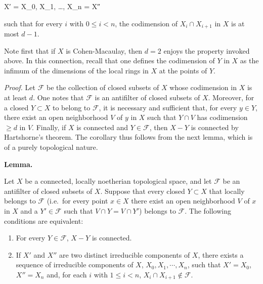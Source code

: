 \documentclass[
]{article}
\newenvironment{Shaded}{}{}
\newcommand{\NormalTok}[1]{#1}
\providecommand{\tightlist}{%
  \setlength{\itemsep}{0pt}\setlength{\parskip}{0pt}}
\begin{document}
\begin{Shaded}
\begin{Highlighting}[]
\NormalTok{X′ = X\_0, X\_1, …, X\_n = X″}
\end{Highlighting}
\end{Shaded}

such that for every \(i\) with \(0 \leqslant i < n\), the codimension of
\(X_{i} \cap X_{i+1}\) in \(X\) is at most \(d - 1\).

Note first that if \(X\) is Cohen-Macaulay, then \(d = 2\) enjoys the
property invoked above. In this connection, recall that one defines the
codimension of \(Y\) in \(X\) as the infimum of the dimensions of the
local rings in \(X\) at the points of \(Y\).

\emph{Proof.} Let \(\mathcal{F}\) be the collection of closed subsets of
\(X\) whose codimension in \(X\) is at least \(d\). One notes that
\(\mathcal{F}\) is an antifilter of closed subsets of \(X\). Moreover,
for a closed \(Y \subset X\) to belong to \(\mathcal{F}\), it is
necessary and sufficient that, for every \(y \in Y\), there exist an
open neighborhood \(V\) of \(y\) in \(X\) such that \(Y \cap V\) has
codimension \(\geqslant d\) in \(V\). Finally, if \(X\) is connected and
\(Y \in \mathcal{F}\), then \(X - Y\) is connected by Hartshorne's
theorem. The corollary thus follows from the next lemma, which is of a
purely topological nature.

\textbf{Lemma.}

Let \(X\) be a connected, locally noetherian topological space, and let
\(\mathcal{F}\) be an antifilter of closed subsets of \(X\). Suppose
that every closed \(Y \subset X\) that locally belongs to
\(\mathcal{F}\) (i.e.~for every point \(x \in X\) there exist an open
neighborhood \(V\) of \(x\) in \(X\) and a \(Y' \in \mathcal{F}\) such
that \(V \cap Y = V \cap Y'\)) belongs to \(\mathcal{F}\). The following
conditions are equivalent:

\begin{enumerate}
\def\labelenumi{\arabic{enumi}.}
\tightlist
\item
  For every \(Y \in \mathcal{F}\), \(X - Y\) is connected.
\item
  If \(X'\) and \(X''\) are two distinct irreducible components of
  \(X\), there exists a sequence of irreducible components of \(X\),
  \(X_{0}, X_{1}, \cdots, X_{n}\), such that \(X' = X_{0}\),
  \(X'' = X_{n}\) and, for each \(i\) with \(1 \leqslant i < n\),
  \(X_{i} \cap X_{i+1} \notin \mathcal{F}\).
\end{enumerate}
\end{document}
